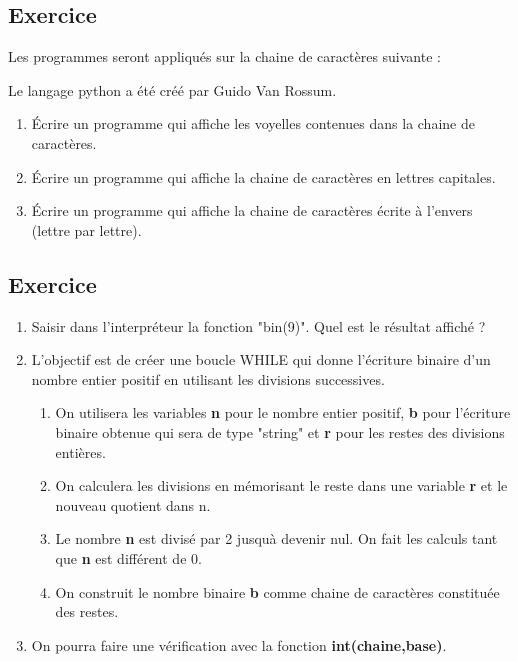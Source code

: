 \documentclass[11pt,a4paper]{article}
\newcounter{numexo}
\begin{document}
\addtocounter{numexo}{1}
\subsection*{\Large Exercice \thenumexo }
Les programmes seront appliqués sur la chaine de caractères suivante :
\begin{center}
Le langage python a été créé par Guido Van Rossum.
\end{center}
\begin{enumerate}
\item Écrire un programme qui affiche les voyelles contenues dans la chaine de caractères.
\item Écrire un programme qui affiche la chaine de caractères en lettres capitales.
\item Écrire un programme qui affiche la chaine de caractères écrite à l'envers (lettre par lettre).
\end{enumerate}

\addtocounter{numexo}{1}
\subsection*{\Large Exercice \thenumexo }
\begin{enumerate}
\item Saisir dans l'interpréteur la fonction "bin(9)". Quel est le résultat affiché ?
\item L'objectif est de créer une boucle WHILE qui donne l'écriture binaire d'un nombre entier positif en utilisant les divisions successives.
\begin{enumerate}
\item On utilisera les variables \textbf{n} pour le nombre entier positif, \textbf{b} pour l'écriture binaire obtenue qui sera de type "string" et \textbf{r} pour les restes des divisions entières.   
\item On calculera les divisions en mémorisant le reste dans une variable \textbf{r} et le nouveau quotient dans n.    
\item Le nombre \textbf{n} est divisé par 2 jusquà devenir nul. On fait les calculs tant que \textbf{n} est différent de 0.    
\item On construit le nombre binaire \textbf{b} comme chaine de caractères constituée des restes.
\end{enumerate}
\item On pourra faire une vérification avec la fonction \textbf{int(chaine,base)}.
\end{enumerate}
\end{document}
